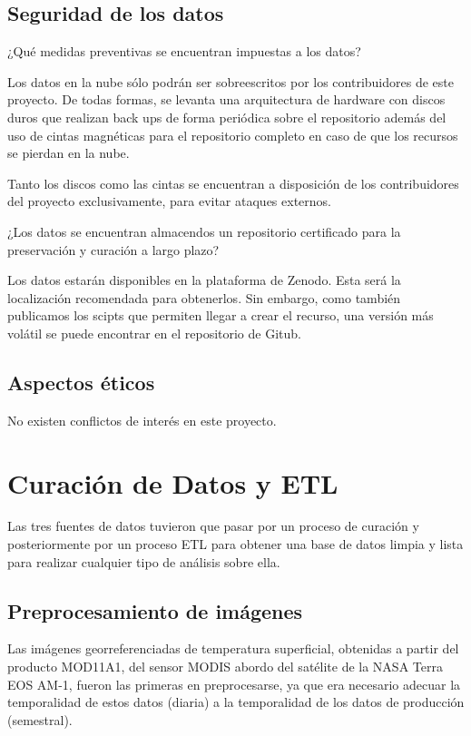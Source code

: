 \documentclass[12pt, spanish]{article}
\begin{document}
\subsection{Seguridad de los datos}
\begin{shaded}
¿Qué medidas preventivas se encuentran impuestas a los datos?
\end{shaded}
Los datos en la nube sólo podrán ser sobreescritos por los contribuidores de este proyecto. De todas formas, se levanta una arquitectura de hardware con discos duros que realizan back ups de forma periódica sobre el repositorio además del uso de cintas magnéticas para el repositorio completo en caso de que los recursos se pierdan en la nube.

Tanto los discos como las cintas se encuentran a disposición de los contribuidores del proyecto exclusivamente, para evitar ataques externos.


\begin{shaded}
¿Los datos se encuentran almacendos un repositorio certificado para la preservación y curación a largo plazo?
\end{shaded}
Los datos estarán disponibles en la plataforma de Zenodo. Esta será la localización recomendada para obtenerlos. Sin embargo, como también publicamos los scipts que permiten llegar a crear el recurso, una versión más volátil se puede encontrar en el repositorio de Gitub.

\subsection{Aspectos éticos}

No existen conflictos de interés en este proyecto.



\section{Curación de Datos y ETL}

Las tres fuentes de datos tuvieron que pasar por un proceso de curación y posteriormente por un proceso ETL para obtener una base de datos limpia y lista para realizar cualquier tipo de análisis sobre ella.

\subsection{Preprocesamiento de imágenes}

Las imágenes georreferenciadas de temperatura superficial, obtenidas a partir del producto MOD11A1, del sensor MODIS abordo del satélite de la NASA Terra EOS AM-1, fueron las primeras en preprocesarse, ya que era necesario adecuar la temporalidad de estos datos (diaria) a la temporalidad de los datos de producción (semestral).
\end{document}
